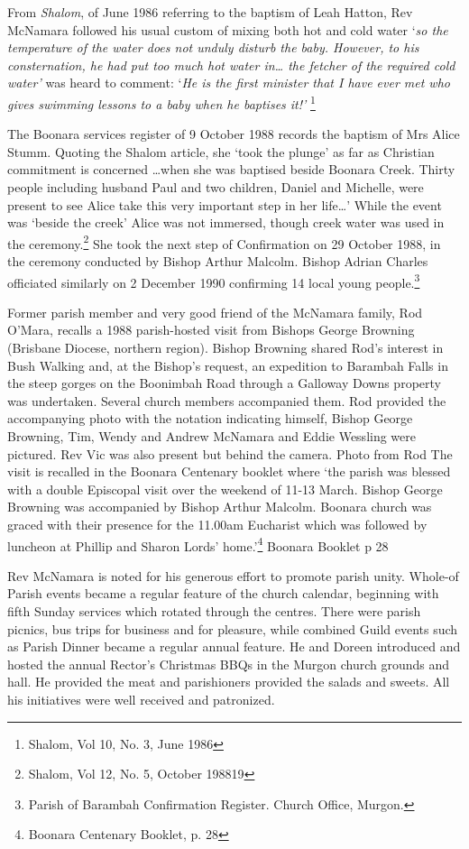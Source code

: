 From \emph{Shalom}, of June 1986 referring to the baptism of Leah Hatton, Rev McNamara followed his usual custom of mixing both hot and cold water `\emph{so the temperature of the water does not unduly disturb the baby. However, to his consternation, he had put too much hot water in\ldots{} the fetcher of the required cold water'} was heard to comment: `\emph{He is the first minister that I have ever met who gives swimming lessons to a baby when he baptises it!'} \footnote{Shalom, Vol 10, No. 3, June 1986}

The Boonara services register of 9 October 1988 records the baptism of Mrs Alice Stumm. Quoting the Shalom article, she `took the plunge' as far as Christian commitment is concerned \ldots when she was baptised beside Boonara Creek. Thirty people including husband Paul and two children, Daniel and Michelle, were present to see Alice take this very important step in her life\ldots' While the event was `beside the creek' Alice was not immersed, though creek water was used in the ceremony.\footnote{Shalom, Vol 12, No. 5, October 198819} She took the next step of Confirmation on 29 October 1988, in the ceremony conducted by Bishop Arthur Malcolm. Bishop Adrian Charles officiated similarly on 2 December 1990 confirming 14 local young people.\footnote{Parish of Barambah Confirmation Register. Church Office, Murgon.}

Former parish member and very good friend of the McNamara family, Rod O'Mara, recalls a 1988 parish-hosted visit from Bishops George Browning (Brisbane Diocese, northern region). Bishop Browning shared Rod's interest in Bush Walking and, at the Bishop's request, an expedition to Barambah Falls in the steep gorges on the Boonimbah Road through a Galloway Downs property was undertaken. Several church members accompanied them. Rod provided the accompanying photo with the notation indicating himself, Bishop George Browning, Tim, Wendy and Andrew McNamara and Eddie Wessling were pictured. Rev Vic was also present but behind the camera. Photo from Rod The visit is recalled in the Boonara Centenary booklet where `the parish was blessed with a double Episcopal visit over the weekend of 11-13 March. Bishop George Browning was accompanied by Bishop Arthur Malcolm. Boonara church was graced with their presence for the 11.00am Eucharist which was followed by luncheon at Phillip and Sharon Lords' home.'\footnote{Boonara Centenary Booklet, p. 28} Boonara Booklet p 28

Rev McNamara is noted for his generous effort to promote parish unity. Whole-of Parish events became a regular feature of the church calendar, beginning with fifth Sunday services which rotated through the centres. There were parish picnics, bus trips for business and for pleasure, while combined Guild events such as Parish Dinner became a regular annual feature. He and Doreen introduced and hosted the annual Rector's Christmas BBQs in the Murgon church grounds and hall. He provided the meat and parishioners provided the salads and sweets. All his initiatives were well received and patronized.

